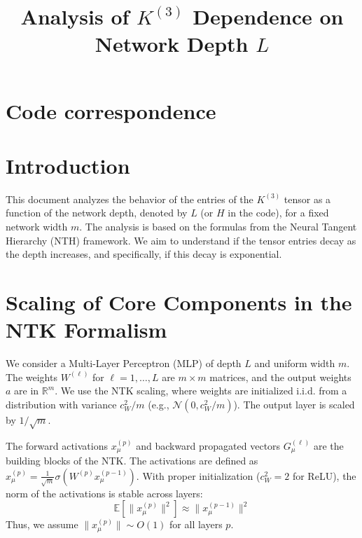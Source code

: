 \documentclass[11pt,a4paper]{article}
\title{\textbf{Analysis of $K^{(3)}$ Dependence on Network Depth $L$}}
\author{}
\date{}
\begin{document}
\maketitle


\section{Code correspondence}



\newpage

\section{Introduction}

This document analyzes the behavior of the entries of the $K^{(3)}$ tensor as a function of the network depth, denoted by $L$ (or $H$ in the code), for a fixed network width $m$. The analysis is based on the formulas from the Neural Tangent Hierarchy (NTH) framework. We aim to understand if the tensor entries decay as the depth increases, and specifically, if this decay is exponential.

\section{Scaling of Core Components in the NTK Formalism}

We consider a Multi-Layer Perceptron (MLP) of depth $L$ and uniform width $m$. The weights $W^{(\ell)}$ for $\ell=1, \dots, L$ are $m \times m$ matrices, and the output weights $a$ are in $\mathbb{R}^m$. We use the NTK scaling, where weights are initialized i.i.d. from a distribution with variance $c_W^2/m$ (e.g., $\mathcal{N}(0, c_W^2/m)$). The output layer is scaled by $1/\sqrt{m}$.

The forward activations $x^{(p)}_\mu$ and backward propagated vectors $G^{(\ell)}_\mu$ are the building blocks of the NTK.
The activations are defined as $x^{(p)}_\mu = \frac{1}{\sqrt{m}}\sigma(W^{(p)} x^{(p-1)}_\mu)$. With proper initialization ($c_W^2=2$ for ReLU), the norm of the activations is stable across layers:
\begin{equation}
    \mathbb{E}[\|x^{(p)}_\mu\|^2] \approx \|x^{(p-1)}_\mu\|^2
\end{equation}
Thus, we assume $\|x^{(p)}_\mu\| \sim O(1)$ for all layers $p$.
\end{document}
